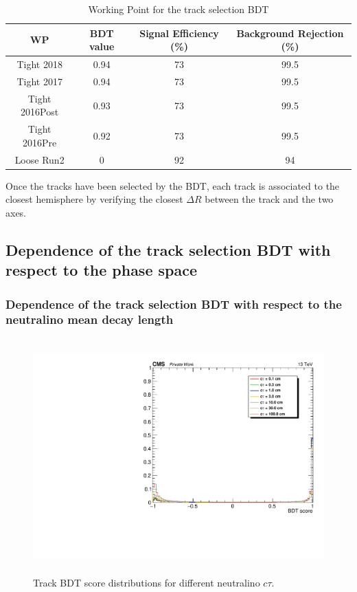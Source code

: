\documentclass{cernatlasnote}
\begin{document}
        \begin{table}[h]
\centering
\begin{tabular}{|c|c|c|c|}
  \hline
  \rowcolor{lightgray} 
  WP & BDT value & Signal Efficiency (\%) & Background Rejection  (\%)\\
  \hline
    Tight 2018 & 0.94 & 73 & 99.5 \\
    Tight 2017 & 0.94 & 73 & 99.5 \\
    Tight 2016Post & 0.93 & 73 & 99.5 \\
    Tight 2016Pre & 0.92 & 73 & 99.5 \\
    \hline
    Loose Run2 & 0 & 92 & 94 \\
  \hline
\end{tabular}
    \caption{Working Point for the track selection BDT}
    \label{tab:TRKBDTWP}
\end{table}

Once the tracks have been selected by the BDT, each track is associated to the closest hemisphere by verifying the closest $\Delta R$ between the track and the two axes.
\subsection{Dependence of the track selection BDT with respect to the phase space}
    \subsubsection{Dependence of the track selection BDT with respect to the neutralino mean decay length}
\begin{figure}[ht]
\centering
\includegraphics[height=9cm, width=12cm, trim= 0cm 0cm 0cm 0cm,clip]{images/TRKBDT/plot_BDTTRKvsctau.pdf}
\caption{\label{fig:BDTctau} Track BDT score distributions for different neutralino $c\tau$. }
\end{figure}
\end{document}
